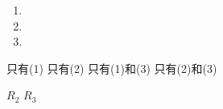 \question\vspace{1cm}
\begin{schoices}
    \choice
    \choice
    \choice
\end{schoices}
\begin{mchoices}
    \choice
    \choice
    \choice
    \item
\end{mchoices}

\question\vspace{1cm}
\begin{samepage}
    \begin{enumerate}[label=\sd]
        \item
              \par
        \item
              \par
        \item
              \par
    \end{enumerate}
\end{samepage}
\begin{samepage}
    \begin{choices}
        \choice 只有(1)
        \choice 只有(2)
        \choice 只有(1)和(3)
        \choice 只有(2)和(3)
    \end{choices}
\end{samepage}

\begin{samepage}
    \question\vspace{1cm}

    \begin{choices}
        \choice
        \choice
        \choice
        \choice
    \end{choices}
\end{samepage}



\question\vspace{1cm}
\begin{samepage}
    \par\hspace{4.5em}$R_2$\hspace{7em} $R_3$
    \begin{choices}
        \choice
        \choice
        \choice
        \choice
    \end{choices}
\end{samepage}

\question
\begin{choices}
    \begin{multicols}{2}
        \choice
        \choice
    \end{multicols}\par
    \begin{multicols}{2}
        \choice
        \CorrectChoice
    \end{multicols}
\end{choices}

